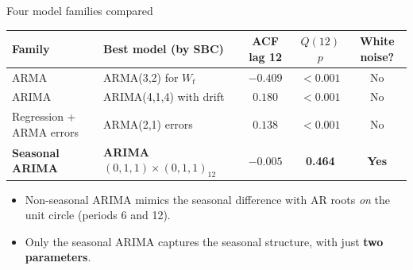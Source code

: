 \documentclass[aspectratio=169,11pt,xcolor=table]{beamer}
\begin{document}
\begin{frame}{Four model families compared}
\centering\footnotesize
\begin{tabular}{@{}llccc@{}}
\toprule
Family & Best model (by SBC) & ACF lag 12 & $Q(12)$ $p$ & White noise?\\
\midrule
ARMA & ARMA(3,2) for $W_t$ & $-0.409$ & $<0.001$ & \alert{No}\\
ARIMA & ARIMA(4,1,4) with drift & $0.180$ & $<0.001$ & \alert{No}\\
Regression + ARMA errors & ARMA(2,1) errors & $0.138$ & $<0.001$ & \alert{No}\\
\rowcolor{oiblue!10}\textbf{Seasonal ARIMA} & \textbf{ARIMA$(0,1,1)\times(0,1,1)_{12}$} & $\mathbf{-0.005}$ & \textbf{0.464} & \textcolor{oigreen}{\textbf{Yes}}\\
\bottomrule
\end{tabular}
\vspace{10pt}
\begin{itemize}
  \item Non-seasonal ARIMA mimics the seasonal difference with AR roots \emph{on} the unit circle (periods 6 and 12).
  \item Only the seasonal ARIMA captures the seasonal structure, with just \textbf{two parameters}.
\end{itemize}
\end{frame}
\end{document}
